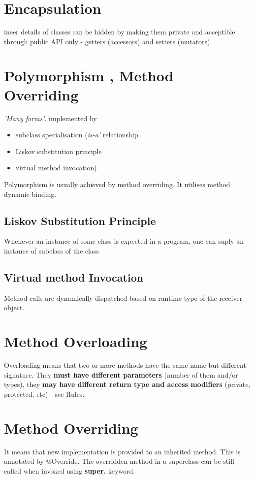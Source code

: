 \documentclass{report}
\begin{document}
\chapter{Encapsulation}
ineer details of classes can be hidden by making them private and acceptible through public API only - getters (accessors)
and setters (mutators).

\chapter{Polymorphism , Method Overriding}
\textit{'Many forms'}. implemented by
\begin{itemize}
	\item subclass specialisation (\textit{is-a'} relationship
	\item Liskov substitution principle
	\item virtual method invocation)
\end{itemize}
Polymorphism is usually achieved by method overriding. It utilises method dynamic binding.

\section{Liskov Substitution Principle}
Whenever an instance of some class is expected in a program, one can suply an instance  of subclass of the class
\section{Virtual method Invocation}
Method calls are dynamically dispatched based on runtime type of the receiver object.

\chapter{Method Overloading}
Overloading means that two or more methods have the same name but different signature. They \textbf{must have different parameters} (number of them and/or types),
 they \textbf{may have different return type and access modifiers} (private, protected, etc) - see Rules.
 
 \chapter{Method Overriding}
It means that new implementation is provided to an inherited method. This is annotated by @Override. The overridden method in a superclass can be still called 
when invoked using \textbf{super.} keyword.
\end{document}
